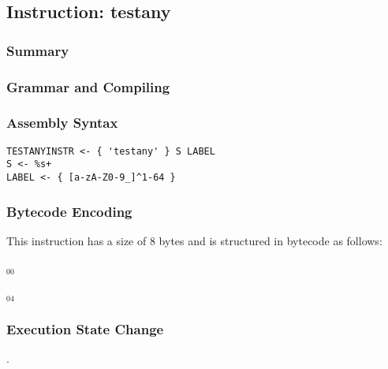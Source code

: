 \subsection{Instruction: testany}

\subsubsection{Summary}


\subsubsection{Grammar and Compiling}


\subsubsection{Assembly Syntax}

\begin{myquote}
\begin{verbatim}
TESTANYINSTR <- { 'testany' } S LABEL
S <- %s+
LABEL <- { [a-zA-Z0-9_]^1-64 }
\end{verbatim}
\end{myquote}


\subsubsection{Bytecode Encoding}

This instruction has a size of 8 bytes and is structured in bytecode as follows:

$_{00}$\ 



$_{04}$\ 


\subsubsection{Execution State Change}

.


